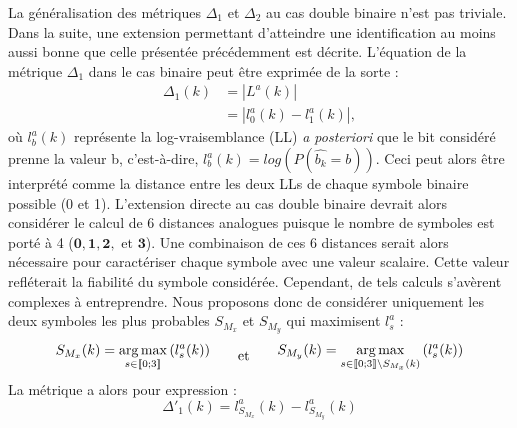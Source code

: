 La généralisation des métriques $\Delta_1$ et $\Delta_2$ au cas double binaire n'est pas triviale. Dans la suite, une 
extension permettant d'atteindre une identification au moins aussi bonne que celle présentée précédemment est décrite.
L'équation de la métrique $\Delta_1$ dans le cas binaire peut être exprimée de la sorte : 
\begin{align*}
\Delta_1(k) &= |L^a(k)|\\
			&= |l^a_0(k)-l^a_1(k)|,
\end{align*}
où $l^a_b(k)$ représente la log-vraisemblance (LL) \textit{a posteriori} que le bit considéré prenne la valeur b, 
c'est-à-dire, 
$l^a_b(k) = log\left(P(\hat{b_k} = b)\right)$. Ceci peut alors être interprété comme la distance entre les deux LLs de chaque 
symbole
binaire possible (0 et 1). L'extension directe au cas double binaire devrait alors considérer le calcul de 6 distances 
analogues puisque le
nombre de symboles est porté à 4 ($\mathbf{0}, \mathbf{1}, \mathbf{2}, \text{~et~} \mathbf{3}$). Une combinaison 
de ces 6 distances serait alors nécessaire pour caractériser chaque symbole avec une valeur scalaire. Cette valeur 
refléterait la fiabilité du symbole considérée. Cependant, de tels calculs s'avèrent complexes à entreprendre. Nous proposons
donc de considérer uniquement les deux symboles les plus probables $S_{M_x}$ et $S_{M_y}$ qui maximisent $l^a_s$ :
\begin{equation*}	\begin{split}
	S_{M_x}(k) = \operatorname*{arg\,max}\limits_{s\in\llbracket0;3\rrbracket}\left(l^a_s(k)\right)
	\end{split}\qquad\text{et}\qquad
	\begin{split}
		 S_{M_y}(k) = \operatorname*{arg\,max}\limits_{s\in\llbracket0;3\rrbracket\setminus{S_{M_x}(k)}}\left(l^a_s(k)\right)
	\end{split} 
\end{equation*}
La métrique a alors pour expression :
\begin{equation}
	\Delta'_1(k) = l^a_{S_{M_x}}(k)-l^a_{S_{M_y}}(k)
\end{equation}

